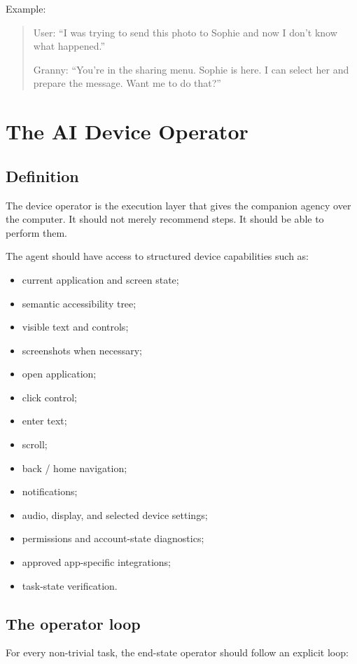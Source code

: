 \documentclass[11pt]{article}
\begin{document}
Example:

\begin{quote}
User: ``I was trying to send this photo to Sophie and now I don't know what happened.''

Granny: ``You're in the sharing menu. Sophie is here. I can select her and prepare the message. Want me to do that?''
\end{quote}

\section{The AI Device Operator}

\subsection{Definition}
The device operator is the execution layer that gives the companion agency over the computer. It should not merely recommend steps. It should be able to perform them.

The agent should have access to structured device capabilities such as:

\begin{itemize}[leftmargin=*]
    \item current application and screen state;
    \item semantic accessibility tree;
    \item visible text and controls;
    \item screenshots when necessary;
    \item open application;
    \item click control;
    \item enter text;
    \item scroll;
    \item back / home navigation;
    \item notifications;
    \item audio, display, and selected device settings;
    \item permissions and account-state diagnostics;
    \item approved app-specific integrations;
    \item task-state verification.
\end{itemize}

\subsection{The operator loop}
For every non-trivial task, the end-state operator should follow an explicit loop:
\end{document}
